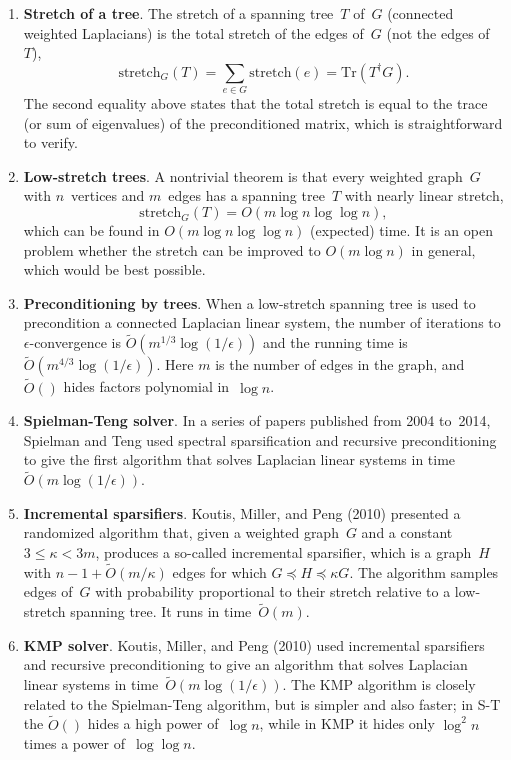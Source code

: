 \documentclass[11pt]{article}
\newcommand{\stretchh}{\mbox{stretch}}
\newcommand{\pinv}{^{\dagger}}          %
\newcommand{\Tr}{\mbox{Tr}}             %
\begin{document}
\begin{enumerate}
\item{\bf Stretch of a tree}.
The stretch of a spanning tree~$T$ of~$G$ 
(connected weighted Laplacians)
is the total stretch of the edges of~$G$ (not the edges of~$T$),
$$\stretchh_G(T)=\sum_{e\in G}\stretchh(e)=\Tr(T\pinv G).$$
The second equality above states that the total stretch is equal to 
the trace (or sum of eigenvalues) of the preconditioned matrix,
which is straightforward to verify.

\item{\bf Low-stretch trees}.
A nontrivial theorem is that every weighted graph~$G$ 
with $n$~vertices and $m$~edges
has a spanning tree~$T$ with nearly linear stretch,
$$\stretchh_G(T)=O(m\log n\log\log n),$$
which can be found in $O(m\log n\log\log n)$ (expected) time.
It is an open problem whether the stretch can be improved
to $O(m\log n)$ in general, which would be best possible.

\item{\bf Preconditioning by trees}.
When a low-stretch spanning tree is used to precondition 
a connected Laplacian linear system, the number of iterations to
$\epsilon$-convergence is $\tilde{O}(m^{1/3}\log(1/\epsilon))$ 
and the running time is $\tilde{O}(m^{4/3}\log(1/\epsilon))$.
Here $m$ is the number of edges in the graph, 
and $\tilde{O}()$ hides factors polynomial in~$\log n$.

\item {\bf Spielman-Teng solver}.
In a series of papers published from 2004 to~2014,
Spielman and Teng used spectral sparsification and
recursive preconditioning to give the first algorithm that
solves Laplacian linear systems in time $\tilde{O}(m\log(1/\epsilon))$.

\item {\bf Incremental sparsifiers}.
Koutis, Miller, and Peng (2010) presented a randomized algorithm that,
given a weighted graph~$G$ and a constant~$3\leq\kappa<3m$, 
produces a so-called incremental sparsifier, 
which is a graph~$H$ with $n-1+ \tilde{O}(m/\kappa)$ edges 
for which $G\preceq H\preceq \kappa G$.
The algorithm samples edges of~$G$ with probability proportional 
to their stretch relative to a low-stretch spanning tree.
It runs in time~$\tilde{O}(m)$.


\item {\bf KMP solver}.
Koutis, Miller, and Peng (2010) used incremental sparsifiers and
recursive preconditioning to give an algorithm that solves Laplacian 
linear systems in time~$\tilde{O}(m\log(1/\epsilon))$.
The KMP algorithm is closely related to the Spielman-Teng algorithm,
but is simpler and also faster;
in S-T the $\tilde{O}()$ hides a high power of~$\log n$,
while in KMP it hides only $\log^2 n$ times a power of~$\log\log n$.


\end{enumerate}
\end{document}
